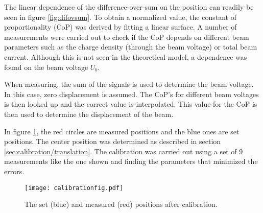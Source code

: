 The linear dependence of the difference-over-sum on the position can readily be seen in figure \ref{fig:difovsum}. To obtain a normalized value, the constant of proportionality (CoP) was derived by fitting a linear surface.
A number of measurements were carried out to check if the CoP depends on different beam parameters such as the charge density (through the beam voltage) or total beam current. Although this is not seen in the theoretical model, a dependence was found on the beam voltage $U_b$.

When measuring, the sum of the signals is used to determine the beam voltage. In this case, zero displacement is assumed. The CoP's for different beam voltages is then looked up and the correct value is interpolated. This value for the CoP is then used to determine the displacement of the beam.

In figure \ref{fig:calfig}, the red circles are measured positions and the blue ones are set positions. The center position was determined as described in section \ref{sec:calibration/translation}. The calibration was carried out using a set of 9 measurements like the one shown and finding the parameters that minimized the errors.

\begin{figure}[H]
\centering
\texttt{[image: calibrationfig.pdf]}
\caption{The set (blue) and measured (red) positions after calibration.}
\label{fig:calfig}
\end{figure}